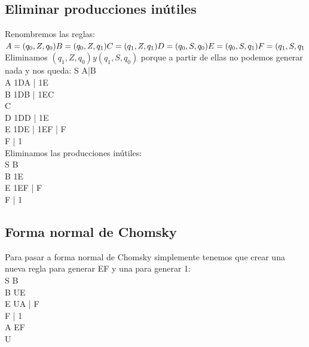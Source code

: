 \documentclass[12pt, spanish]{article}
\begin{document}
\subsection{Eliminar producciones inútiles}
Renombremos las reglas:\\
\begin{math}
A = (q_{0},Z,q_{0})\\
B = (q_{0},Z,q_{1})\\
C = (q_{1},Z,q_{1})\\
D = (q_{0},S,q_{0})\\
E = (q_{0},S,q_{1})\\
F = (q_{1},S,q_{1}\\
\end{math}
Eliminamos \begin{math}
(q_{1},Z,q_{0}) y (q_{1},S,q_{0})
\end{math} porque a partir de ellas no podemos generar nada y nos queda:
S \rightarrow A|B\\
A \rightarrow 1DA | 1E\\
B \rightarrow 1DB | 1EC\\
C \rightarrow \epsilon\\
D \rightarrow 1DD | 1E\\
E \rightarrow 1DE | 1EF | F\\
F  | 1\\

Eliminamos las producciones inútiles:\\
S \rightarrow B\\
B \rightarrow 1E\\
E \rightarrow 1EF | F\\
F  | 1\\

\subsection{Forma normal de Chomsky}
Para pasar a forma normal de Chomsky simplemente tenemos que crear una nueva regla para generar EF y una para generar 1:\\
S \rightarrow B\\
B \rightarrow UE\\
E \rightarrow UA | F\\
F  | 1\\
A \rightarrow EF\\
U 
\end{document}
